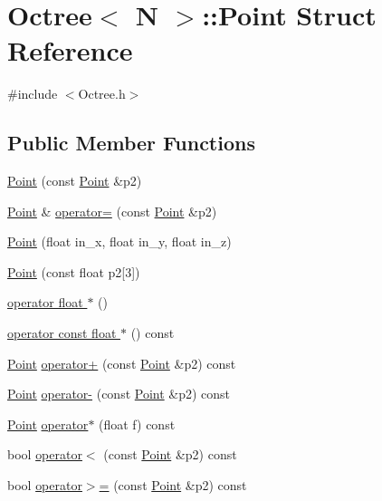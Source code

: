 \hypertarget{structOctree_1_1Point}{}\section{Octree$<$ N $>$\+:\+:Point Struct Reference}
\label{structOctree_1_1Point}


{\ttfamily \#include $<$Octree.\+h$>$}

\subsection*{Public Member Functions}
\begin{DoxyCompactItemize}
\item 
\hyperlink{structOctree_1_1Point_a8fb37f6be2d72663f65679a6bdf8a072}{Point} (const \hyperlink{structOctree_1_1Point}{Point} \&p2)
\item 
\hyperlink{structOctree_1_1Point}{Point} \& \hyperlink{structOctree_1_1Point_a9e2960b98f3ac79776059cf246f0f59c}{operator=} (const \hyperlink{structOctree_1_1Point}{Point} \&p2)
\item 
\hyperlink{structOctree_1_1Point_aa975ea20806ba51e539babf90d02d8fe}{Point} (float in\+\_\+x, float in\+\_\+y, float in\+\_\+z)
\item 
\hyperlink{structOctree_1_1Point_a3e5cabcc10b5fb45bbc0f4b319b602ee}{Point} (const float p2\mbox{[}3\mbox{]})
\item 
\hyperlink{structOctree_1_1Point_a3fcf6d4f07745fc664104f2d3920cea5}{operator float $\ast$} ()
\item 
\hyperlink{structOctree_1_1Point_a7ad910fbeb11417626e23b433e9bfe0b}{operator const float $\ast$} () const
\item 
\hyperlink{structOctree_1_1Point}{Point} \hyperlink{structOctree_1_1Point_ad973b650a63bf4d1cb27cc1283f922a5}{operator+} (const \hyperlink{structOctree_1_1Point}{Point} \&p2) const
\item 
\hyperlink{structOctree_1_1Point}{Point} \hyperlink{structOctree_1_1Point_a116fe11d8dfc0b06a803028c618a1449}{operator-\/} (const \hyperlink{structOctree_1_1Point}{Point} \&p2) const
\item 
\hyperlink{structOctree_1_1Point}{Point} \hyperlink{structOctree_1_1Point_ab39615ca08e620c9e33f83ca7202c7cd}{operator$\ast$} (float f) const
\item 
bool \hyperlink{structOctree_1_1Point_a5fb32b368c4540562b725b89e943a604}{operator$<$} (const \hyperlink{structOctree_1_1Point}{Point} \&p2) const
\item 
bool \hyperlink{structOctree_1_1Point_a05e5b33aad4677d75cf15a4c995d4aa4}{operator$>$=} (const \hyperlink{structOctree_1_1Point}{Point} \&p2) const
\end{DoxyCompactItemize}
